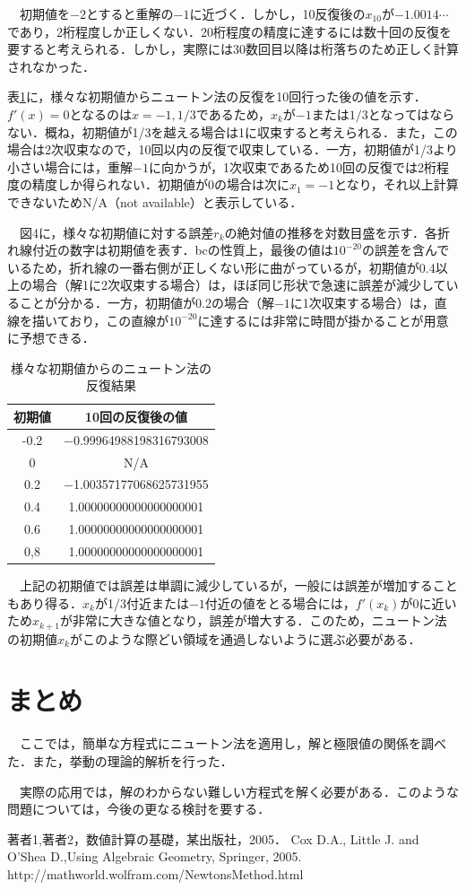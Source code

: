 \documentclass[a4j,11pt]{jarticle}
\begin{document}
　初期値を$-2$とすると重解の$-1$に近づく．しかし，10反復後の$x_{10}$が$-1.0014\cdots$であり，2桁程度しか正しくない．20桁程度の精度に達するには数十回の反復を要すると考えられる．しかし，実際には30数回目以降は桁落ちのため正しく計算されなかった．

表\ref{table}に，様々な初期値からニュートン法の反復を10回行った後の値を示す．$f'(x)=0$となるのは$x=-1,1/3$であるため，$x_k$が$-1$または$1/3$となってはならない．概ね，初期値が1/3を越える場合は1に収束すると考えられる．また，この場合は2次収束なので，10回以内の反復で収束している．一方，初期値が1/3より小さい場合には，重解$-1$に向かうが，1次収束であるため10回の反復では2桁程度の精度しか得られない．初期値が0の場合は次に$x_1=-1$となり，それ以上計算できないためN/A（not available）と表示している．

　図4に，様々な初期値に対する誤差$r_k$の絶対値の推移を対数目盛を示す．各折れ線付近の数字は初期値を表す．bcの性質上，最後の値は$10^{-20}$の誤差を含んでいるため，折れ線の一番右側が正しくない形に曲がっているが，初期値が0.4以上の場合（解1に2次収束する場合）は，ほぼ同じ形状で急速に誤差が減少していることが分かる．一方，初期値が0.2の場合（解$-1$に1次収束する場合）は，直線を描いており，この直線が$10^{-20}$に達するには非常に時間が掛かることが用意に予想できる．
\begin{center}
\begin{table}
\begin{tabular}{c|c}
\hline
初期値&10回の反復後の値\\
\hline
-0.2&−0.99964988198316793008\\
0&N/A\\
0.2&−1.00357177068625731955\\
0.4&1.00000000000000000001\\
0.6&1.00000000000000000001\\
0,8&1.00000000000000000001\\
\hline
\end{tabular}
\caption{様々な初期値からのニュートン法の反復結果}
\label{table}
\end{table}
\end{center}
　上記の初期値では誤差は単調に減少しているが，一般には誤差が増加することもあり得る．$x_k$が1/3付近または$-1$付近の値をとる場合には，$f'(x_k)$が0に近いため$x_{k+1}$が非常に大きな値となり，誤差が増大する．このため，ニュートン法の初期値$x_k$がこのような際どい領域を通過しないように選ぶ必要がある．
\section{まとめ}
　ここでは，簡単な方程式にニュートン法を適用し，解と極限値の関係を調べた．また，挙動の理論的解析を行った．

　実際の応用では，解のわからない難しい方程式を解く必要がある．このような問題については，今後の更なる検討を要する．

\begin{thebibliography}{99}
 著者1,著者2，数値計算の基礎，某出版社，2005．
 Cox D.A., Little J. and O'Shea D.,Using Algebraic Geometry, Springer, 2005.
 http://mathworld.wolfram.com/NewtonsMethod.html
\end{thebibliography}
\end{document}
